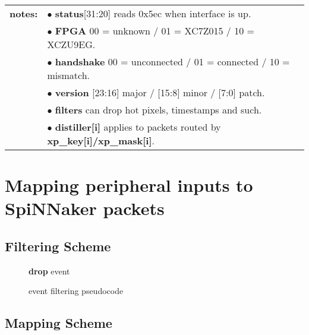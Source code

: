 \documentclass[11pt,a4paper,twoside]{article}
\begin{document}
\begin{center}
	\begin{tabularx}{\textwidth}{| l X |}
		\hline
		\textbf{notes:} & $\bullet$ \textbf{status}[31:20] reads 0x5ec when interface is up.              \\%
		                & $\bullet$ \textbf{FPGA} 00 = unknown / 01 = XC7Z015 / 10 = XCZU9EG.             \\%
		                & $\bullet$ \textbf{handshake} 00 = unconnected / 01 = connected / 10 = mismatch. \\%
		                & $\bullet$ \textbf{version} [23:16] major / [15:8] minor / [7:0] patch.          \\%
		                & $\bullet$ \textbf{filters} can drop hot pixels, timestamps and such.            \\%
		                & $\bullet$ \textbf{distiller[i]} applies to packets routed by \textbf{xp\_key[i]/xp\_mask[i]}. \\%
		\hline
	\end{tabularx}
\end{center}


\clearpage
\section{Mapping peripheral inputs to SpiNNaker packets}


\subsection{Filtering Scheme}


\begin{figure}[!ht]
	\centering
	\begin{minipage}{0.75\columnwidth}
		\begin{algorithm}[H]
			\caption{event filtering pseudocode}
			\begin{algorithmic}[1]
						\State \textbf{drop} event
					\EndIf
				\EndFor
			\end{algorithmic}
			\label{alg:filter}
		\end{algorithm}
	\end{minipage}
\end{figure}


\subsection{Mapping Scheme}
\end{document}
